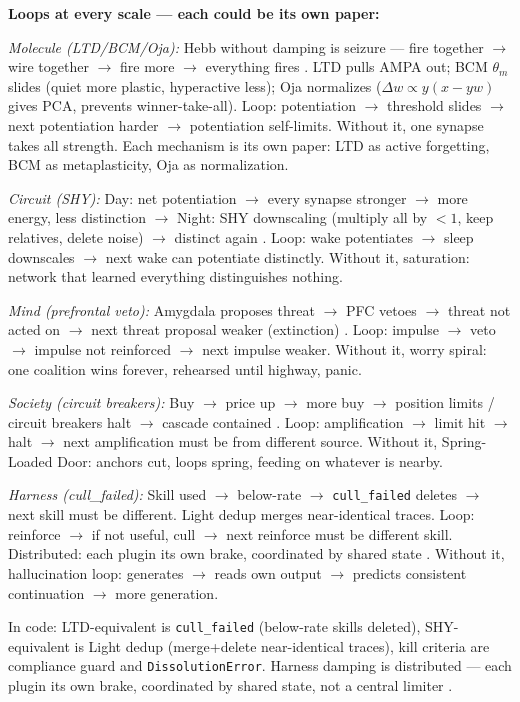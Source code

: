 \documentclass[11pt]{article}
\begin{document}
\textbf{Loops at every scale --- each could be its own paper:}

\textit{Molecule (LTD/BCM/Oja):} Hebb without damping is seizure --- fire together $\to$ wire together $\to$ fire more $\to$ everything fires \citep{tononi2014}. LTD pulls AMPA out; BCM $\theta_m$ slides (quiet more plastic, hyperactive less); Oja normalizes ($\Delta w \propto y(x - yw)$ gives PCA, prevents winner-take-all). Loop: potentiation $\to$ threshold slides $\to$ next potentiation harder $\to$ potentiation self-limits. Without it, one synapse takes all strength. Each mechanism is its own paper: LTD as active forgetting, BCM as metaplasticity, Oja as normalization.

\textit{Circuit (SHY):} Day: net potentiation $\to$ every synapse stronger $\to$ more energy, less distinction $\to$ Night: SHY downscaling (multiply all by $<1$, keep relatives, delete noise) $\to$ distinct again \citep{tononi2014}. Loop: wake potentiates $\to$ sleep downscales $\to$ next wake can potentiate distinctly. Without it, saturation: network that learned everything distinguishes nothing.

\textit{Mind (prefrontal veto):} Amygdala proposes threat $\to$ PFC vetoes $\to$ threat not acted on $\to$ next threat proposal weaker (extinction) \citep{seth2021}. Loop: impulse $\to$ veto $\to$ impulse not reinforced $\to$ next impulse weaker. Without it, worry spiral: one coalition wins forever, rehearsed until highway, panic.

\textit{Society (circuit breakers):} Buy $\to$ price up $\to$ more buy $\to$ position limits / circuit breakers halt $\to$ cascade contained \citep{white1986}. Loop: amplification $\to$ limit hit $\to$ halt $\to$ next amplification must be from different source. Without it, Spring-Loaded Door: anchors cut, loops spring, feeding on whatever is nearby.

\textit{Harness (cull\_failed):} Skill used $\to$ below-rate $\to$ \texttt{cull\_failed} deletes $\to$ next skill must be different. Light dedup merges near-identical traces. Loop: reinforce $\to$ if not useful, cull $\to$ next reinforce must be different skill. Distributed: each plugin its own brake, coordinated by shared state \citep{lin2026ahe}. Without it, hallucination loop: generates $\to$ reads own output $\to$ predicts consistent continuation $\to$ more generation.

In code: LTD-equivalent is \texttt{cull\_failed} (below-rate skills deleted), SHY-equivalent is Light dedup (merge+delete near-identical traces), kill criteria are compliance guard and \texttt{DissolutionError}. Harness damping is distributed --- each plugin its own brake, coordinated by shared state, not a central limiter \citep{lin2026ahe}.
\end{document}
